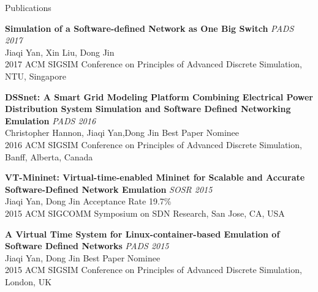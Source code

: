 \documentclass{resume} %
\begin{document}

\begin{rSection}{Publications}

{\bf Simulation of a Software-defined Network as One Big Switch} \hfill {\em PADS 2017}\\ 
Jiaqi Yan, Xin Liu, Dong Jin \\
2017 ACM SIGSIM Conference on Principles of Advanced Discrete Simulation, NTU, Singapore

{\bf DSSnet: A Smart Grid Modeling Platform Combining Electrical Power Distribution System
    Simulation and Software Defined Networking Emulation} \hfill {\em PADS 2016}\\ 
Christopher Hannon, Jiaqi Yan,Dong Jin \hfill {\color{red}Best Paper Nominee} \\
2016 ACM SIGSIM Conference on Principles of Advanced Discrete Simulation, Banff, Alberta, Canada

{\bf VT-Mininet: Virtual-time-enabled Mininet for Scalable and Accurate Software-Defined Network Emulation} \hfill {\em SOSR 2015}\\ 
Jiaqi Yan, Dong Jin \hfill {\color{red}Acceptance Rate 19.7\%} \\
2015 ACM SIGCOMM Symposium on SDN Research, San Jose, CA, USA

{\bf A Virtual Time System for Linux-container-based Emulation of Software Defined Networks} \hfill {\em PADS 2015}\\
Jiaqi Yan, Dong Jin \hfill {\color{red}Best Paper Nominee} \\
2015 ACM SIGSIM Conference on Principles of Advanced Discrete Simulation, London, UK

\end{rSection}

\end{document}

